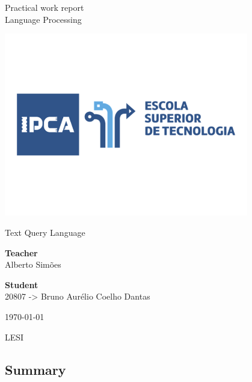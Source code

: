\documentclass{article}
\begin{document}
\begin{titlepage}
    \begin{center}
            
        \Large
            
        Practical work report
        \\ Language Processing
            
        \vspace{0.8cm}
            
        \includegraphics[width=0.8\textwidth]{EST}
        
        \vspace{0.5cm}
        
        \LARGE
        
        Text Query Language
            
        \vspace{1cm}
        
        \textbf{Teacher \\}
        Alberto Simões
        
        \vspace{1cm}
        
        \textbf{Student \\}
        20807 -> Bruno Aurélio Coelho Dantas
        
        \vspace{1cm}
        
        \today
        
        \vspace{1cm}

        LESI    
    \end{center}
\end{titlepage}

\Large
\begin{center}
    \section*{Summary}
\end{center}
\end{document}
